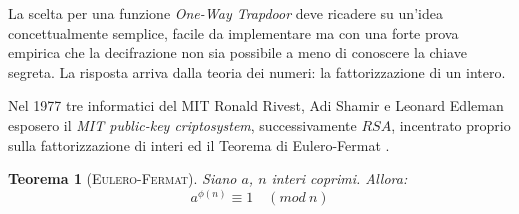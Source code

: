\documentclass[twoside,symmetric,justified,openany,nobib]{tufte-book}
\newtheorem{thm}{Teorema}
\begin{document}

La scelta per una funzione \textit{One-Way Trapdoor} deve ricadere su un'idea concettualmente semplice, facile da implementare ma con una forte prova empirica che la decifrazione non sia possibile a meno di conoscere la chiave segreta. La risposta arriva dalla teoria dei numeri: la fattorizzazione di un intero.

Nel 1977 tre informatici del MIT Ronald Rivest, Adi Shamir e Leonard Edleman esposero il \textit{MIT public-key criptosystem}, successivamente $RSA$, incentrato proprio sulla fattorizzazione di interi ed il Teorema di Eulero-Fermat \cite{rivest-shamir-edleman}.

\begin{thm}[\textsc{Eulero-Fermat}]
  Siano $a$, $n$ interi coprimi. Allora:
  \begin{equation}
    a^{\phi(n)}\equiv 1\quad (mod\ n)
  \end{equation}
\end{thm}
\end{document}
